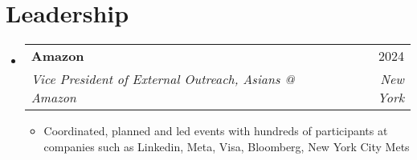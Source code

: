 \documentclass[letterpaper,11pt]{article}
\makeatletter
\newcommand{\resumeItem}[1]{
  \item\small{
    {#1 \vspace{-2pt}}
  }
}
\newcommand{\resumeSubheading}[4]{
  \vspace{-2pt}\item
    \begin{tabular*}{0.97\textwidth}[t]{l@{\extracolsep{\fill}}r}
      \textbf{#1} & #2 \\
      \textit{\small#3} & \textit{\small #4} \\
    \end{tabular*}\vspace{-7pt}
}
\newcommand{\resumeSubHeadingListStart}{\begin{itemize}[leftmargin=0.15in, label={}]}
\newcommand{\resumeSubHeadingListEnd}{\end{itemize}}
\newcommand{\resumeItemListStart}{\begin{itemize}}
\newcommand{\resumeItemListEnd}{\end{itemize}\vspace{-5pt}}
\makeatother
\begin{document}
\section{Leadership}
    \resumeSubHeadingListStart
        \resumeSubheading
      {Amazon}{2024}
      {Vice President of External Outreach, Asians @ Amazon}{New York}
      \resumeItemListStart
        \resumeItem{Coordinated, planned and led events with hundreds of participants at companies such as Linkedin, Meta, Visa, Bloomberg, New York City Mets }
        \resumeItemListEnd
    \resumeSubHeadingListEnd
\end{document}

